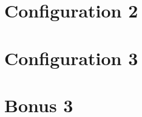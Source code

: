 \documentclass[11pt]{article}
\begin{document}
\section{Configuration 2}\label{sect:cfg2}

\section{Configuration 3}\label{sect:cfg3}

\section{Bonus 3}\label{sect:bonus3}
\end{document}
